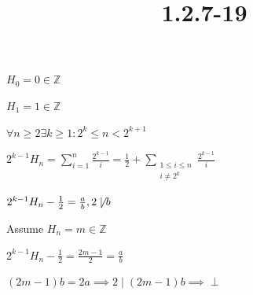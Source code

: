 \documentclass{article}
\title{1.2.7-19}
\begin{document}
\maketitle

\( H_0 = 0 \in \mathbb{Z} \)

\( H_1 = 1 \in \mathbb{Z} \)

\( \forall n \geq 2 \exists k\geq 1: 2^k \leq n < 2^{k+1} \)

\( 2^{k-1}H_n = \sum_{i=1}^n \frac{2^{k-1}}{i} = \frac{1}{2} + \sum_{\substack{1 \leq i \leq n\\ i \neq 2^k}} \frac{2^{k-1}}{i} \)

\( 2^{k-1}H_n - \frac{1}{2} = \frac{a}{b}, 2 \not\mid b \)

Assume \( H_n = m \in \mathbb{Z} \)

\( 2^{k-1}H_n - \frac{1}{2} = \frac{2m-1}{2} = \frac{a}{b} \)

\( (2m-1)b = 2a \implies 2 \mid (2m-1)b \implies \perp \)
\end{document}
